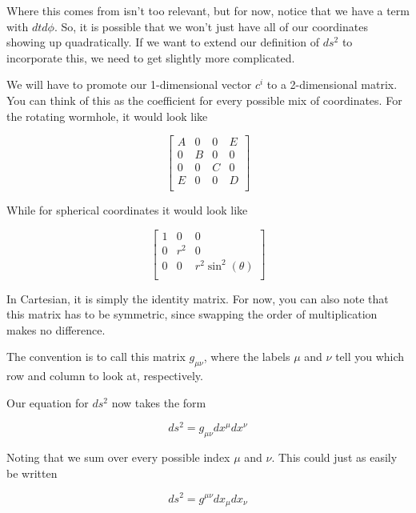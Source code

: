 \documentclass{article}
\begin{document}
Where this comes from isn't too relevant, but for now, notice that we have a term with $dtd\phi$. So, it is possible that we won't just have all of our coordinates showing up quadratically. If we want to extend our definition of $ds^2$ to incorporate this, we need to get slightly more complicated.

We will have to promote our 1-dimensional vector $c^i$ to a 2-dimensional matrix. You can think of this as the coefficient for every possible mix of coordinates. For the rotating wormhole, it would look like

\begin{equation}
    \begin{bmatrix}
    A & 0 & 0 & E \\
    0 & B & 0 & 0 \\
    0 & 0 & C & 0 \\
    E & 0 & 0 & D \\
    \end{bmatrix}
\end{equation}

While for spherical coordinates it would look like

\begin{equation}
    \begin{bmatrix}
    1 & 0 & 0 \\
    0 & r^2 & 0 \\
    0 & 0 & r^2\sin^2(\theta)\\
    \end{bmatrix}
\end{equation}

In Cartesian, it is simply the identity matrix. For now, you can also note that this matrix has to be symmetric, since swapping the order of multiplication makes no difference.

The convention is to call this matrix $g_{\mu\nu}$, where the labels $\mu$ and $\nu$ tell you which row and column to look at, respectively.

Our equation for $ds^2$ now takes the form

\begin{equation}
    ds^2 = g_{\mu\nu} dx^\mu dx^\nu    
\end{equation}

Noting that we sum over every possible index $\mu$ and $\nu$. This could just as easily be written 

\begin{equation}
    ds^2 = g^{\mu\nu} dx_\mu dx_\nu    
\end{equation}
\end{document}
